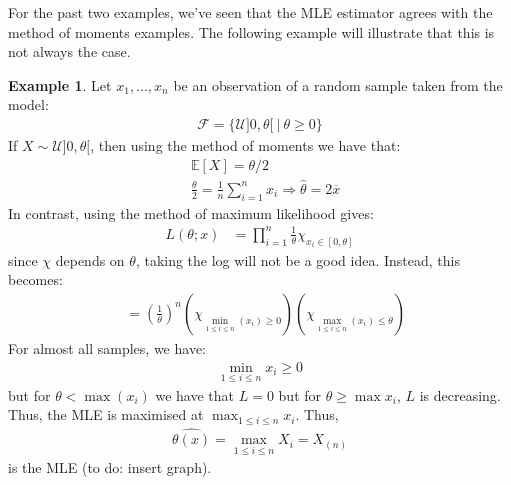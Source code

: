 \documentclass[11pt]{scrartcl}
\theoremstyle{definition}
\newtheorem{ex}{Example}
\theoremstyle{remark}
\newcommand{\dist}[0]{\mathcal{F}}
\newcommand{\smean}[0]{\frac{1}{n} \sum_{i=1}^n x_i}
\newcommand{\EX}[1]{\mathbb{E}\left[#1 \right]}
\begin{document}
For the past two examples, we've seen that the MLE estimator agrees with the method of moments examples. The following example will illustrate that this is not always the case. 
\begin{ex} 
	Let $x_1, ..., x_n$ be an observation of a random sample taken from the model: 
	\begin{align*}
		\dist = \{ \mathcal{U}]0, \theta [\ |\ \theta \geq 0 \} 	
	\end{align*}
	If $X \sim \mathcal{U}]0, \theta[$, then using the method of moments we have that: 
	\begin{align*}
		& \EX{X} = \theta/2 \\
		& \frac{\theta}{2} = \smean \Rightarrow \hat{\theta} = 2 \overline{x}
	\end{align*}
	In contrast, using the method of maximum likelihood gives: 
	\begin{align*}
		L(\theta; x ) & = \prod_{i=1}^n \frac{1}{\theta} \chi_{x_i \in [0, \theta] } 	
	\end{align*}
	since $\chi$ depends on $\theta$, taking the log will not be a good idea. Instead, this becomes: 
	\begin{align*}
			& = \left( \frac{1}{\theta} \right)^n ( \chi_{\min_{1 \leq i \leq n} (x_i) \geq 0} )( \chi_{\max_{1 \leq i \leq n} (x_i) \leq \theta} )
	\end{align*}
	For almost all samples, we have: 
	\begin{align*}
		\min_{1 \leq i \leq n} x_i \geq 0	
	\end{align*}
	but for $\theta < \max (x_i)$ we have that $L=0$ but for $\theta \geq \max x_i$, $L$ is decreasing. Thus, the MLE is maximised at $\max_{1 \leq i \leq n} x_i$. Thus, 
	\begin{align*}	
		\hat{\theta(x)} = \max_{1 \leq i \leq n} X_i = X_{(n)}	
	\end{align*}
	is the MLE (to do: insert graph). 
\end{ex}
\end{document}
